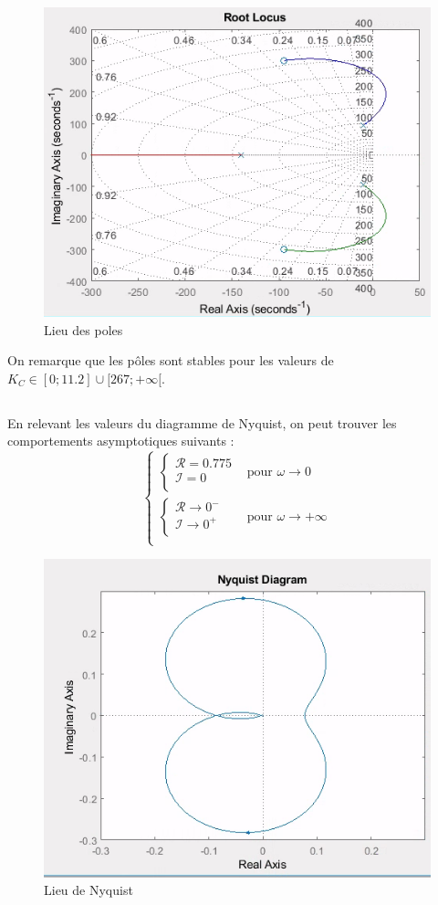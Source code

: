 \documentclass{article}
\begin{document}
\subsection{}
\begin{figure}[h]
    \centering
    \includegraphics[width=0.75\linewidth]{rlocus214.png}
    \caption{Lieu des poles}
    \label{fig:rlocus214}
\end{figure}
On remarque que les pôles sont stables pour les valeurs de $K_C\in[0;11.2]\cup[267;+\infty[$.
\subsection{}
En relevant les valeurs du diagramme de Nyquist, on peut trouver les comportements asymptotiques suivants :
\begin{equation*}
    \begin{cases}
        \begin{cases}
            \mathcal{R}=0.775\\
            \mathcal{I}=0\\
        \end{cases}&\text{pour }\omega\rightarrow0\\
        \begin{cases}
            \mathcal{R}\rightarrow0^-\\
            \mathcal{I}\rightarrow0^+\\
        \end{cases}&\text{pour }\omega\rightarrow+\infty\\
    \end{cases}
\end{equation*}
\begin{figure}[h]
    \centering
    \includegraphics[width=0.5\linewidth]{nyquist215.png}
    \caption{Lieu de Nyquist}
    \label{fig:nyquist215}
\end{figure}
\end{document}
